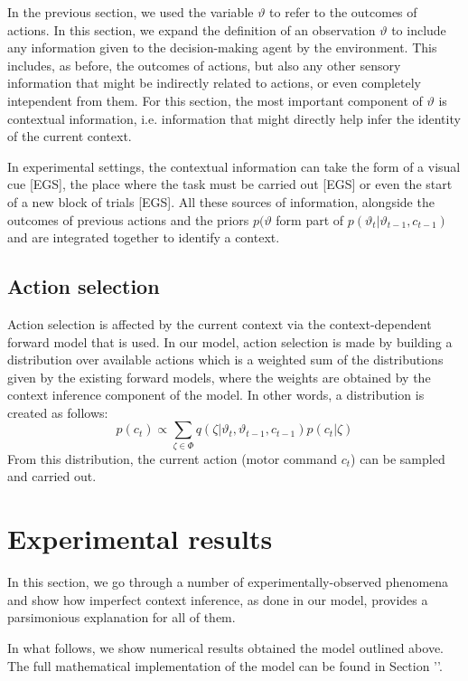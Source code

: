 \documentclass[a4paper,doc,floatsintext,natbib]{apa6}
\def \sref #1{Section '\nameref{#1}'}    %
\begin{document}
In the previous section, we used the variable $\vartheta$ to refer to the outcomes of actions. In this section, we expand the definition of an observation $\vartheta$ to include any information given to the decision-making agent by the environment. This includes, as before, the outcomes of actions, but also any other sensory information that might be indirectly related to actions, or even completely intependent from them. For this section, the most important component of $\vartheta$ is contextual information, i.e. information that might directly help infer the identity of the current context.

In experimental settings, the contextual information can take the form of a visual cue [EGS], the place where the task must be carried out [EGS] or even the start of a new block of trials [EGS]. All these sources of information, alongside the outcomes of previous actions and the priors $p(\vartheta$ form part of $p(\vartheta_t | \vartheta_{t-1
}, c_{t-1})$ and are integrated together to identify a context.

\subsection{Action selection}
Action selection is affected by the current context via the context-dependent forward model that is used. In our model, action selection is made by building a distribution over available actions which is a weighted sum of the distributions given by the existing forward models, where the weights are obtained by the context inference component of the model. In other words, a distribution is created as follows:
\begin{equation}
p(c_t) \propto \displaystyle\sum_{\zeta \in \Phi}q(\zeta | \vartheta_t, \vartheta_{t-1}, c_{t-1}) p(c_t | \zeta)
\end{equation}
From this distribution, the current action (motor command $c_t$) can be sampled and carried out.

\section{Experimental results}
In this section, we go through a number of experimentally-observed phenomena and show how imperfect context inference, as done in our model, provides a parsimonious explanation for all of them.

In what follows, we show numerical results obtained the model outlined above. The full mathematical implementation of the model can be found in \sref{subsection:model-description}.
\end{document}
